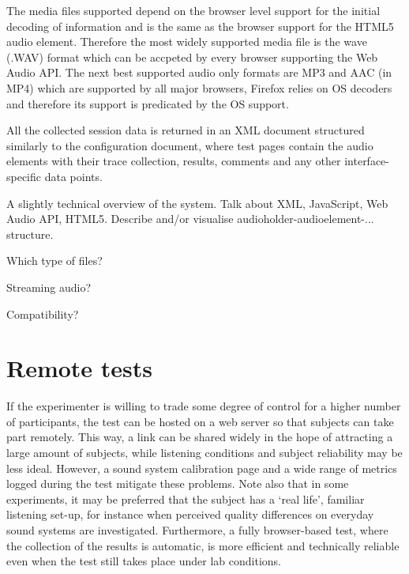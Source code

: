 \documentclass{sig-alternate}
\begin{document}
    The media files supported depend on the browser level support for the initial decoding of information and is the same as the browser support for the HTML5 audio element. Therefore the most widely supported media file is the wave (.WAV) format which can be accpeted by every browser supporting the Web Audio API. The next best supported audio only formats are MP3 and AAC (in MP4) which are supported by all major browsers, Firefox relies on OS decoders and therefore its support is predicated by the OS support.
    
    All the collected session data is returned in an XML document structured similarly to the configuration document, where test pages contain the audio elements with their trace collection, results, comments and any other interface-specific data points.
    
	A slightly technical overview of the system. Talk about XML, JavaScript, Web Audio API, HTML5. 
	Describe and/or visualise audioholder-audioelement-... structure. 


	Which type of files? %
	
	Streaming audio? %

	Compatibility? %


	
	
\section{Remote tests} %

	If the experimenter is willing to trade some degree of control for a higher number of participants, the test can be hosted on a web server so that subjects can take part remotely. This way, a link can be shared widely in the hope of attracting a large amount of subjects, while listening conditions and subject reliability may be less ideal. However, a sound system calibration page and a wide range of metrics logged during the test mitigate these problems. Note also that in some experiments, it may be preferred that the subject has a `real life', familiar listening set-up, for instance when perceived quality differences on everyday sound systems are investigated. 
	Furthermore, a fully browser-based test, where the collection of the results is automatic, is more efficient and technically reliable even when the test still takes place under lab conditions.
\end{document}
